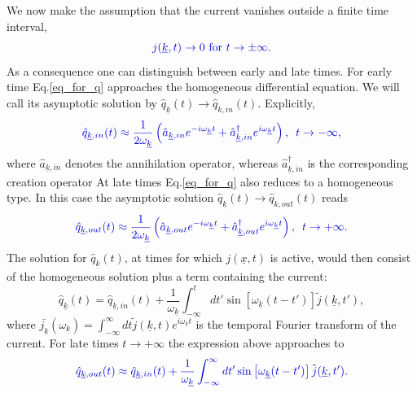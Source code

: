 \documentclass[12pt, titlepage]{article}
\begin{document}
We now make the assumption that the current vanishes outside a finite time interval,
\begin{equation}
\textcolor[RGB]{0,0,204}{
j(\underline{k},t)\rightarrow 0 \text{ for } t\rightarrow \pm \infty
}.
\end{equation}
As a consequence one can distinguish between early and late times. For early time  Eq.\enskip\eqref{eq_for_q} approaches the homogeneous differential equation. We will call its asymptotic solution by $ \hat{q}_{\underline{k}}(t) \rightarrow \hat{q}_{k,in}(t) $. Explicitly, 
\begin{equation}\label{q_In_operators}
 \textcolor[RGB]{0,0,204}{
 \hat{q}_{\underline{k},in}(t) 
  \approx
  \dfrac{1}{2\omega_{\underline{k}}}\left(
	\hat{a}_{\underline{k},in} 
	e^{-i\omega_{\underline{k}}t}
	+
	\hat{a}^{\dagger}_{\underline{k},in}  
	e^{i\omega_{\underline{k}}t}
  \right) 
  ,
   \enskip t\rightarrow -\infty,}
\end{equation}
where $ \hat{a}_{\underline{k},in} $ denotes the annihilation operator, whereas $ \hat{a}^{\dagger}_{\underline{k},in} $ is the corresponding creation operator
At late times Eq.\enskip\eqref{eq_for_q} also reduces to a homogeneous type. In this case the asymptotic solution $ \hat{q}_{\underline{k}}(t) \rightarrow \hat{q}_{k,out}(t) $ reads
\begin{equation}\label{q_Out_operators}
 \textcolor[RGB]{0,0,204}{
 \hat{q}_{\underline{k},out}(t) 
  \approx
  \dfrac{1}{2\omega_{\underline{k}}}\left(
	\hat{a}_{\underline{k},out} 
	e^{-i\omega_{\underline{k}}t}
	+
	\hat{a}^{\dagger}_{\underline{k},out}  
	e^{i\omega_{\underline{k}}t}
  \right) 
  ,
  \enskip t\rightarrow +\infty.}
\end{equation}
The solution for $ \hat{q}_{\underline{k}}(t) $, at times for which $ j(\underline{x},t) $ is active, would then consist of the homogeneous solution plus a term containing the current:
\begin{equation}\label{q_full}
 \hat{q}_{\underline{k}}(t) 
  =
  \hat{q}_{\underline{k},in}(t) 
  +
    \dfrac{1}{\omega_{\underline{k}}}
    \int^{t}_{-\infty}
    dt'
    \sin\left[\omega_{\underline{k}}(t-t') \right] \tilde{j}(\underline{k},t')
    ,
\end{equation}
where $ \bar{j_{\underline{k}}}(\omega_{\underline{k}})= \int^{\infty}_{-\infty}dt \tilde{j}(\underline{k},t) e^{i\omega_{\underline{k}}t} $ is the temporal Fourier transform of the current.
For late times $ t\rightarrow +\infty $ the expression above approaches to
\begin{equation}\label{q_Out_by_q_In}
 \textcolor[RGB]{0,0,204}{
\hat{q}_{\underline{k},out}(t) 
  \approx
  \hat{q}_{\underline{k},in}(t) 
  +
    \dfrac{1}{\omega_{\underline{k}}}
    \int^{\infty}_{-\infty}
    dt'
    \sin
    \left[
    \omega_{\underline{k}}(t-t') 
    \right]
     \tilde{j}(\underline{k},t')
  .}
\end{equation}
\end{document}
